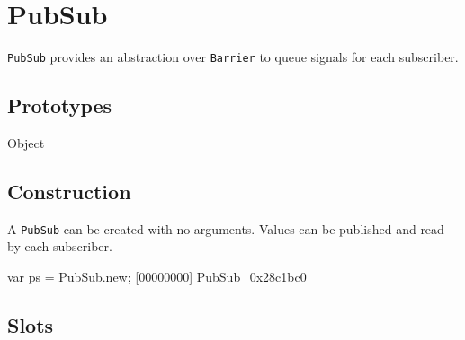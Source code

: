 \section{PubSub}

\lstinline|PubSub| provides an abstraction over \lstinline|Barrier|
 to queue signals for each subscriber.

\subsection{Prototypes}

\begin{refObjects}
\item[Object]
\end{refObjects}

\subsection{Construction}

A \lstinline|PubSub| can be created with no arguments.  Values can be
published and read by each subscriber.

\begin{urbiscript}[firstnumber=1]
var ps = PubSub.new;
[00000000] PubSub_0x28c1bc0
\end{urbiscript}

\subsection{Slots}

